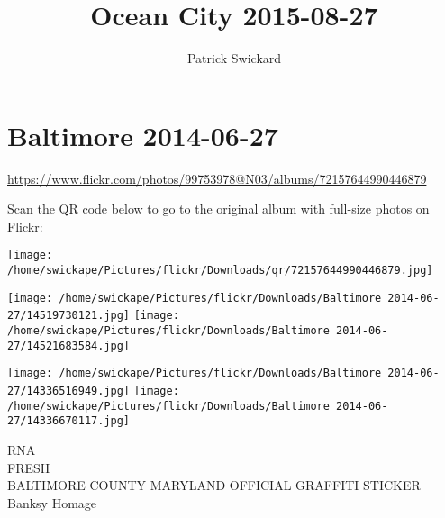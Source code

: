 \documentclass[10pt,letterpaper]{article}
\title{Ocean City 2015-08-27}
\author{Patrick Swickard}
\date{}
\begin{document}
\section*{Baltimore 2014-06-27}

\url{https://www.flickr.com/photos/99753978@N03/albums/72157644990446879}

Scan the QR code below to go to the original album with full-size photos on Flickr:

\texttt{[image: /home/swickape/Pictures/flickr/Downloads/qr/72157644990446879.jpg]}
\pagebreak

\texttt{[image: /home/swickape/Pictures/flickr/Downloads/Baltimore 2014-06-27/14519730121.jpg]}
\texttt{[image: /home/swickape/Pictures/flickr/Downloads/Baltimore 2014-06-27/14521683584.jpg]}

\texttt{[image: /home/swickape/Pictures/flickr/Downloads/Baltimore 2014-06-27/14336516949.jpg]}
\texttt{[image: /home/swickape/Pictures/flickr/Downloads/Baltimore 2014-06-27/14336670117.jpg]}

RNA\\
FRESH\\
BALTIMORE COUNTY MARYLAND OFFICIAL GRAFFITI STICKER\\
Banksy Homage
\pagebreak
\end{document}
